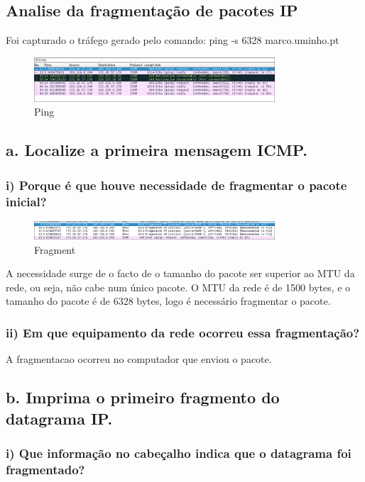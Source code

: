 \documentclass{article}
\begin{document}
\subsection{Analise da fragmentação de pacotes IP}
Foi capturado o tráfego gerado pelo comando: ping -s 6328 marco.uminho.pt

\begin{figure}[h]
    \centering
    \includegraphics[width=0.8\textwidth]{images/ping.png}
    \caption{\label{fig:ping}Ping}
\end{figure}

\subsection*{a. Localize a primeira mensagem ICMP.}
\subsubsection*{i) Porque é que houve necessidade
de fragmentar o pacote inicial?}
\begin{figure}[h]
    \centering
    \includegraphics[width=0.8\textwidth]{images/fragment.png}
    \caption{\label{fig:fragment}Fragment}
\end{figure}

A necessidade surge de o facto de o tamanho do pacote ser superior ao MTU da rede, ou seja, não cabe num único pacote. O MTU da rede é de 1500 bytes, e o tamanho do pacote é de 6328 bytes, logo é necessário fragmentar o pacote.

\subsubsection*{ii) Em que equipamento da rede ocorreu
essa fragmentação?}

A fragmentacao ocorreu no computador que enviou o pacote. 

\subsection*{b. Imprima o primeiro fragmento do datagrama IP.}
\subsubsection*{i) Que informação no
cabeçalho indica que o datagrama foi fragmentado?}
\end{document}
